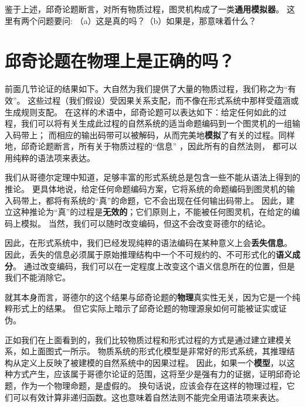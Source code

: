 \documentclass[a4paper,12pt]{article}
\begin{document}
鉴于上述，\gls{邱奇论题}断言，对所有\gls{物质过程}，\gls{图灵机}构成了一类\textbf{\gls{通用模拟器}}。 这里有两个问题要问: （a）这是真的吗？（b）如果是，那意味着什么？

\section{邱奇论题在物理上是正确的吗？}

前面几节论证的结果如下。大自然为我们提供了大量的\gls{物质过程}，我们称之为“有效”。
这些过程（我们假设）受\gls{因果关系}支配，而不像在\gls{形式系统}中那样受\gls{蕴涵}或\gls{生成规则}支配。
在这样的术语中，\gls{邱奇论题}可以表达如下：给定任何如此的过程，我们可以将有关\gls{生成}此过程的自然系统的适当命题\gls{编码}到一个\gls{图灵机}的一组输入码带上；
而相应的输出码带可以被\gls{解码}，从而完美地\textbf{\gls{模拟}}了有关的过程。同样地，\gls{邱奇论题}断言，所有关于\gls{物质过程}的“信息” ，因此所有的\gls{自然法则}，
都可以用纯粹的\gls{语法项}来表达。

我们从哥德尔定理中知道，足够丰富的\gls{形式系统}总是包含一些不能从\gls{语法}上得到的推论。
更具体地说，给定任何命题\gls{编码}方案，它将系统的命题\gls{编码}到\gls{图灵机}的输入码带上，都将有系统的“真”的命题，它不会出现在任何输出码带上。
因此，建立这种推论为“真”的过程是\textbf{无效的}；它们原则上，不能被任何\gls{图灵机}，在给定的编码上\gls{模拟}。
当然，我们可以随时改变\gls{编码}，但这不会改变哥德尔的结论。

因此，在\gls{形式系统}中，我们已经发现纯粹的\gls{语法编码}在某种意义上会\textbf{丢失信息}。
因此，丢失的信息必须属于原始\gls{推理结构}中一个不可规约的、不可\gls{形式化}的\textbf{\gls{语义成分}}。
通过改变\gls{编码}，我们可以在一定程度上改变这个\gls{语义信息}所在的位置，但是我们不能消除它。

就其本身而言，哥德尔的这个结果与\gls{邱奇论题}的\textbf{物理}真实性无关，因为它是一个纯粹形式上的结果。
但它实际上暗示了\gls{邱奇论题}的物理源泉如何可能被证实或证伪。

正如我们在上面看到的，我们比较\gls{物质过程}和\gls{形式过程}的方式是通过建立\gls{建模关系}，如上面图式一所示。
\gls{物质系统}的\gls{形式化}\gls{模型}是非常好的\gls{形式系统}，其\gls{推理结构}从定义上反映了被建模的自然系统中的\gls{因果过程}。
因此，如果一个\textbf{\gls{模型}}，以这种方式产生，应该属于哥德尔论证的范围，这将至少是强有力的证据，证明\gls{邱奇论题}，作为一个物理命题，是虚假的。
换句话说，应该会存在这样的物理过程，它们可以有效计算非递归函数。这也意味着\gls{自然法则}不能完全用\gls{语法项}来表达。
\end{document}
